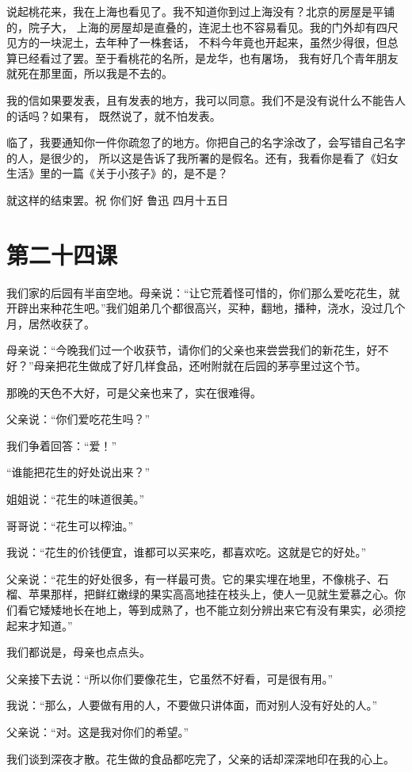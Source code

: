 \documentclass[12pt,UTF8]{ctexbook}
\begin{document}
说起桃花来，我在上海也看见了。我不知道你到过上海没有？北京的房屋是平铺的，院子大，
上海的房屋却是直叠的，连泥土也不容易看见。我的门外却有四尺见方的一块泥土，去年种了一株套话，
不料今年竟也开起来，虽然少得很，但总算已经看过了罢。至于看桃花的名所，是龙华，也有屠场，
我有好几个青年朋友就死在那里面，所以我是不去的。

我的信如果要发表，且有发表的地方，我可以同意。我们不是没有说什么不能告人的话吗？如果有，
既然说了，就不怕发表。

临了，我要通知你一件你疏忽了的地方。你把自己的名字涂改了，会写错自己名字的人，是很少的，
所以这是告诉了我所署的是假名。还有，我看你是看了《妇女生活》里的一篇《关于小孩子》的，是不是？

就这样的结束罢。祝
你们好
鲁迅
四月十五日

\section{第二十四课}

我们家的后园有半亩空地。母亲说：“让它荒着怪可惜的，你们那么爱吃花生，就开辟出来种花生吧。”我们姐弟几个都很高兴，买种，翻地，播种，浇水，没过几个月，居然收获了。

母亲说：“今晚我们过一个收获节，请你们的父亲也来尝尝我们的新花生，好不好？”母亲把花生做成了好几样食品，还咐附就在后园的茅亭里过这个节。

那晚的天色不大好，可是父亲也来了，实在很难得。

父亲说：“你们爱吃花生吗？”

我们争着回答：“爱！”

“谁能把花生的好处说出来？”

姐姐说：“花生的味道很美。”

哥哥说：“花生可以榨油。”

我说：“花生的价钱便宜，谁都可以买来吃，都喜欢吃。这就是它的好处。”

父亲说：“花生的好处很多，有一样最可贵。它的果实埋在地里，不像桃子、石榴、苹果那样，把鲜红嫩绿的果实高高地挂在枝头上，使人一见就生爱慕之心。你们看它矮矮地长在地上，等到成熟了，也不能立刻分辨出来它有没有果实，必须挖起来才知道。”

我们都说是，母亲也点点头。

父亲接下去说：“所以你们要像花生，它虽然不好看，可是很有用。”

我说：“那么，人要做有用的人，不要做只讲体面，而对别人没有好处的人。”

父亲说：“对。这是我对你们的希望。”

我们谈到深夜才散。花生做的食品都吃完了，父亲的话却深深地印在我的心上。
\end{document}
